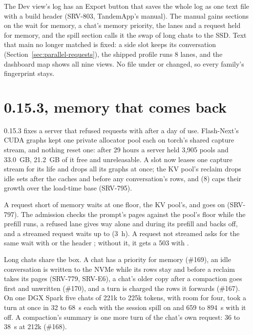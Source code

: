 The Dev view's log has an Export button that saves the whole log as one text file with a build header (SRV-803, TandemApp's manual). The manual gains sections on the wait for memory, a chat's memory priority, the lanes and a request held for memory, and the spill section calls it the swap of long chats to the SSD. Text that main no longer matched is fixed: a side slot keeps its conversation (Section~\ref{sec:parallel-requests}), the shipped profile runs 8 lanes, and the dashboard map shows all nine views. No file under  or  changed, so every family's fingerprint stays.

\section{0.15.3, memory that comes back}\label{sec:changelog-0153}

0.15.3 fixes a server that refused requests with  after a day of use. Flash-Next's CUDA graphs kept one private allocator pool each on torch's shared capture stream, and nothing reset one: after 29 hours a server held 3,905 pools and 33.0~GB, 21.2~GB of it free and unreleasable. A slot now leases one capture stream for its life and drops all its graphs at once; the KV pool's reclaim drops idle sets after the caches and before any conversation's rows, and  (8) caps their growth over the load-time base (SRV-795).

A request short of memory waits at one floor, the KV pool's, and goes on (SRV-797). The admission checks the prompt's pages against the pool's floor while the prefill runs, a refused lane gives way alone and during its prefill and backs off, and a streamed request waits up to  (3~h). A request not streamed asks for the same wait with  or the header ; without it, it gets a 503 with .

Long chats share the box. A chat has a priority for memory (\#169), an idle conversation is written to the NVMe while its rows stay and before a reclaim takes its pages (SRV-779, SRV-E6), a chat's older copy after a compaction goes first and unwritten (\#170), and a turn is charged the rows it forwards (\#167). On one DGX Spark five chats of 221k to 225k tokens, with room for four, took a turn at once in 32 to 68~s each with the session spill on and 659 to 894~s with it off. A compaction's summary is one more turn of the chat's own request: 36 to 38~s at 212k (\#168).

